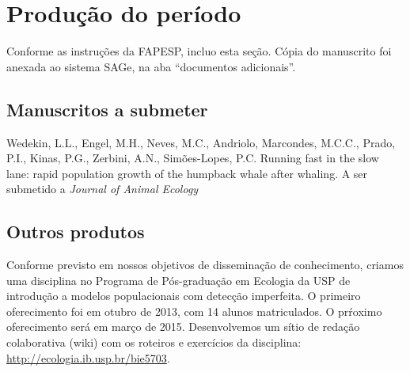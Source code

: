 \section{Produção do período} %
Conforme as instruções da FAPESP, incluo esta seção. 
Cópia do manuscrito foi anexada ao sistema SAGe, na aba ``documentos adicionais''.

\subsection{Manuscritos a submeter}
\label{sec:manuscritos-submeter}
Wedekin, L.L., Engel, M.H., Neves, M.C., Andriolo, Marcondes, M.C.C., Prado, P.I., Kinas, P.G., Zerbini, A.N., 
Simões-Lopes, P.C. Running fast in the slow lane: rapid population growth of the humpback whale after whaling. A ser submetido a \emph{Journal of Animal Ecology}

\subsection{Outros produtos}
\label{sec:outros-produtos}

Conforme previsto em nossos objetivos de disseminação de conhecimento, 
criamos uma disciplina no Programa de Pós-graduação em Ecologia da USP de introdução
a modelos populacionais com detecção imperfeita. O primeiro oferecimento foi em otubro de 2013,
com 14 alunos matriculados. O prŕoximo oferecimento será em março de 2015. Desenvolvemos um sítio
de redação colaborativa (wiki) com os roteiros e exercícios da disciplina: \url{http://ecologia.ib.usp.br/bie5703}.
